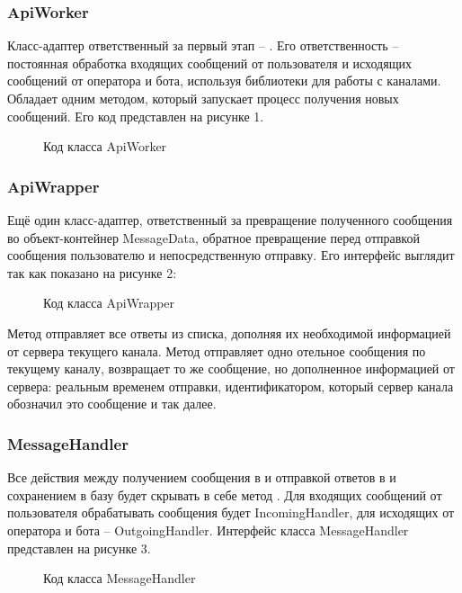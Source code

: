    \subsubsection{ApiWorker}
    Класс-адаптер ответственный за первый этап -- .
    Его ответственность -- постоянная обработка входящих сообщений от 
    пользователя и исходящих сообщений от оператора и бота, используя библиотеки
    для работы с каналами. Обладает одним методом, который запускает процесс 
    получения новых сообщений. Его код представлен на рисунке 1.
    \begin{figure}[H]
        \centering
        
        \caption{Код класса ApiWorker}
        \label{fig:api_worker}
    \end{figure}


    \subsubsection{ApiWrapper}
    Ещё один класс-адаптер, ответственный за превращение полученного сообщения 
    во объект-контейнер MessageData, обратное превращение перед отправкой
    сообщения пользователю и непосредственную отправку.
    Его интерфейс выглядит так как показано на рисунке 2:
    \begin{figure}[H]
        \centering
        
        \caption{Код класса ApiWrapper}
        \label{fig:api_wrapper}
    \end{figure}
    
    Метод  отправляет все ответы из списка, дополняя их
    необходимой информацией от сервера текущего канала. 
    Метод  отправляет одно отельное сообщения по текущему каналу,
    возвращает то же сообщение, но дополненное информацией от сервера: реальным временем
    отправки, идентификатором, который сервер канала обозначил это сообщение и так далее.


    \subsubsection{MessageHandler}
    Все действия между получением сообщения в  и отправкой ответов
    в  и сохранением в базу будет скрывать в себе метод
    . Для входящих сообщений от пользователя обрабатывать
    сообщения будет IncomingHandler, для исходящих от оператора и бота -- OutgoingHandler.
    Интерфейс класса MessageHandler представлен на рисунке 3.
    \begin{figure}[H]
        \centering
        
        \caption{Код класса MessageHandler}
        \label{fig:message_handler}
    \end{figure}

